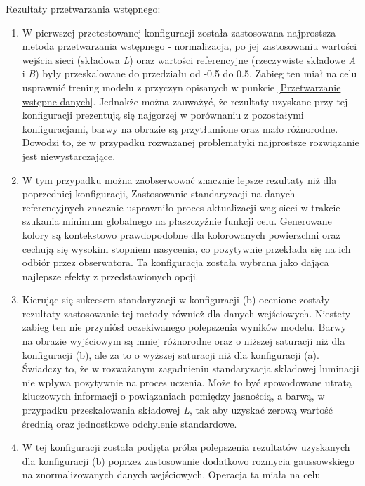   \noindent
  Rezultaty przetwarzania wstępnego:
  \begin{enumerate}[label=(\alph*)]
    \item W pierwszej przetestowanej konfiguracji została zastosowana najprostsza
    metoda przetwarzania wstępnego - normalizacja, po jej zastosowaniu wartości wejścia sieci
    (składowa \textit{L}) oraz wartości referencyjne (rzeczywiste składowe
    \textit{A} i \textit{B}) były przeskalowane do przedziału od -0.5 do 0.5. Zabieg ten miał na
    celu usprawnić trening modelu z przyczyn opisanych w punkcie
    \ref{Przetwarzanie wstępne danych}. Jednakże można zauważyć, że rezultaty
    uzyskane przy tej konfiguracji prezentują się najgorzej w porównaniu z
    pozostałymi konfiguracjami, barwy na obrazie są przytłumione oraz mało
    różnorodne. Dowodzi to, że w przypadku rozważanej problematyki najprostsze
    rozwiązanie jest niewystarczające.
    \item W tym przypadku można zaobserwować znacznie lepsze rezultaty niż dla
    poprzedniej konfiguracji, Zastosowanie standaryzacji na danych referencyjnych
    znacznie usprawniło proces aktualizacji wag sieci w trakcie szukania minimum
    globalnego na płaszczyźnie funkcji celu. Generowane kolory są kontekstowo
    prawdopodobne dla kolorowanych powierzchni oraz cechują się wysokim stopniem
    nasycenia, co pozytywnie przekłada się na ich odbiór przez obserwatora. Ta
    konfiguracja została wybrana jako dająca najlepsze efekty z przedstawionych
    opcji.
    \item Kierując się sukcesem standaryzacji w konfiguracji (b) ocenione
    zostały rezultaty zastosowanie tej metody również dla danych wejściowych.
    Niestety zabieg ten nie przyniósł oczekiwanego polepszenia wyników
    modelu. Barwy na obrazie wyjściowym są mniej różnorodne oraz o
    niższej saturacji niż dla konfiguracji (b), ale za to o wyższej saturacji
    niż dla konfiguracji (a). Świadczy to, że w rozważanym zagadnieniu
    standaryzacja składowej luminacji nie wpływa pozytywnie na proces uczenia.
    Może to być spowodowane utratą kluczowych informacji o powiązaniach pomiędzy
    jasnością, a barwą, w przypadku przeskalowania składowej \textit{L}, tak aby
    uzyskać zerową wartość średnią oraz jednostkowe odchylenie standardowe.
    \item W tej konfiguracji została podjęta próba polepszenia rezultatów
    uzyskanych dla konfiguracji (b) poprzez zastosowanie dodatkowo rozmycia
    gaussowskiego na znormalizowanych danych wejściowych. Operacja ta miała na celu

\end{enumerate}
